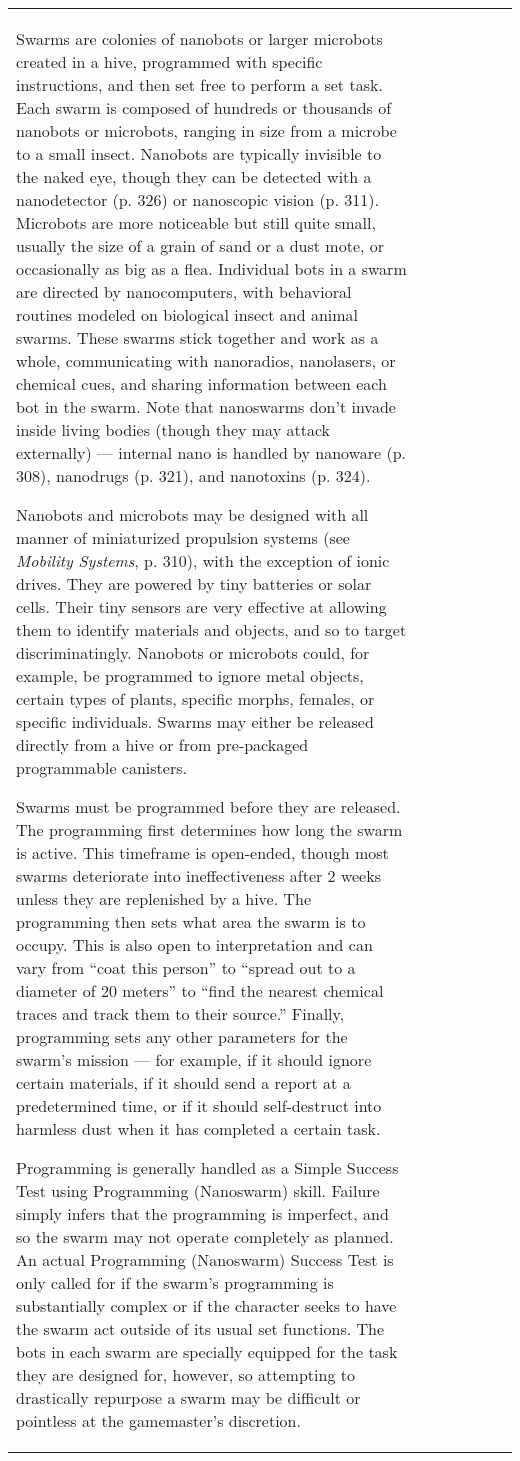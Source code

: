 \begin{tabular}{|l|l|l|l|l|l|l|}
Swarms are colonies of nanobots or larger microbots created in a hive, programmed with specific instructions, and then set free to perform a set task. Each swarm is composed of hundreds or thousands of nanobots or microbots, ranging in size from a microbe to a small insect. Nanobots are typically invisible to the naked eye, though they can be detected with a nanodetector (p. 326) or nanoscopic vision (p. 311). Microbots are more noticeable but still quite small, usually the size of a grain of sand or a dust mote, or occasionally as big as a flea. Individual bots in a swarm are directed by nanocomputers, with behavioral routines modeled on biological insect and animal swarms. These swarms stick together and work as a whole, communicating with nanoradios, nanolasers, or chemical cues, and sharing information between each bot in the swarm. Note that nanoswarms don’t invade inside living bodies (though they may attack externally) --- internal nano is handled by nanoware (p. 308), nanodrugs (p. 321), and nanotoxins (p. 324). 

Nanobots and microbots may be designed with all manner of miniaturized propulsion systems (see \emph{Mobility Systems}, p. 310), with the exception of ionic drives. They are powered by tiny batteries or solar cells. Their tiny sensors are very effective at allowing them to identify materials and objects, and so to target discriminatingly. Nanobots or microbots could, for example, be programmed to ignore metal objects, certain types of plants, specific morphs, females, or specific individuals. Swarms may either be released directly from a hive or from pre-packaged programmable canisters. 

Swarms must be programmed before they are released. The programming first determines how long the swarm is active. This timeframe is open-ended, though most swarms deteriorate into ineffectiveness after 2 weeks unless they are replenished by a hive. The programming then sets what area the swarm is to occupy. This is also open to interpretation and can vary from ``coat this person'' to ``spread out to a diameter of 20 meters'' to ``find the nearest chemical traces and track them to their source.'' Finally, programming sets any other parameters for the swarm’s mission --- for example, if it should ignore certain materials, if it should send a report at a predetermined time, or if it should self-destruct into harmless dust when it has completed a certain task. 

Programming is generally handled as a Simple Success Test using Programming (Nanoswarm) skill. Failure simply infers that the programming is imperfect, and so the swarm may not operate completely as planned. An actual Programming (Nanoswarm) Success Test is only called for if the swarm’s programming is substantially complex or if the character seeks to have the swarm act outside of its usual set functions. The bots in each swarm are specially equipped for the task they are designed for, however, so attempting to drastically repurpose a swarm may be difficult or pointless at the gamemaster’s discretion. 


\end{tabular}
